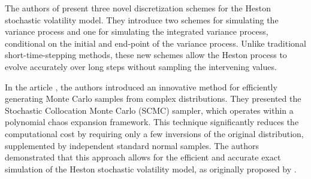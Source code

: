 \documentclass[]{interact}
\theoremstyle{plain}%
\theoremstyle{definition}
\theoremstyle{remark}
\begin{document}

The authors of \cite{chan2010fast} present three novel discretization schemes for the Heston stochastic volatility model. They introduce two schemes for simulating the variance process and one for simulating the integrated variance process, conditional on the initial and end-point of the variance process. Unlike traditional short-time-stepping methods, these new schemes allow the Heston process to evolve accurately over long steps without sampling the intervening values.

In the article \cite{grzelak2019stochastic}, the authors introduced an innovative method for efficiently generating Monte Carlo samples from complex distributions. They presented the Stochastic Collocation Monte Carlo (SCMC) sampler, which operates within a polynomial chaos expansion framework. This technique significantly reduces the computational cost by requiring only a few inversions of the original distribution, supplemented by independent standard normal samples. The authors demonstrated that this approach allows for the efficient and accurate exact simulation of the Heston stochastic volatility model, as originally proposed by \cite{broadie2006exact}.





\end{document}
